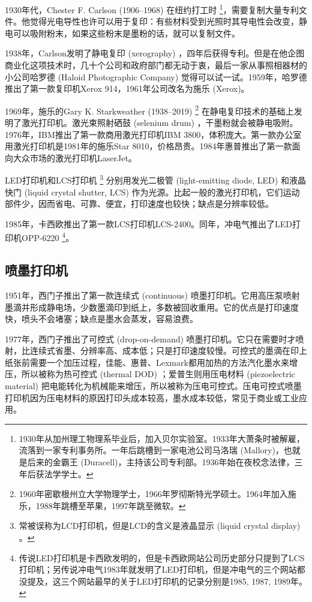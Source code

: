 1930年代，Chester F. Carlson (1906--1968)\indexCarlson{} 在纽约打工时 \footnote{1930年从加州理工物理系毕业后，加入贝尔实验室。1933年大萧条时被解雇，流落到一家专利事务所。一年后跳槽到一家电池公司马洛瑞 (Mallory)，也就是后来的金霸王 (Duracell)，主持该公司专利部。1936年始在夜校念法律，三年后获法学学士。}，需要复制大量专利文件。他觉得光电导性也许可以用于复印：有些材料受到光照时其导电性会改变，静电可以吸附粉末，如果这些粉末是墨粉的话，就可以复制文件。

1938年，Carlson发明了静电复印 (xerography) ，四年后获得专利。但是在他企图商业化这项技术时，几十个公司和政府部门都无动于衷，最后一家从事照相器材的小公司哈罗德 (Haloid Photographic Company)\indexHaloid{} 觉得可以试一试。1959年，哈罗德推出了第一款复印机Xerox 914，1961年公司改名为施乐 (Xerox)\indexXerox{}。

1969年，施乐的Gary K. Starkweather (1938--2019)\indexStarkweather{} \footnote{1960年密歇根州立大学物理学士，1966年罗彻斯特光学硕士。1964年加入施乐，1988年跳槽至苹果，1997年跳至微软。} 在静电复印技术的基础上发明了激光打印机。激光束照射硒鼓 (selenium drum) ，干墨粉就会被静电吸附。1976年，IBM\indexIBM{}推出了第一款商用激光打印机IBM 3800，体积庞大。第一款办公室用激光打印机是1981年的施乐Star 8010，价格昂贵。1984年惠普\indexHP{}推出了第一款面向大众市场的激光打印机LaserJet。

LED打印机和LCS打印机 \footnote{常被误称为LCD打印机，但是LCD的含义是液晶显示 (liquid crystal display) 。} 分别用发光二极管 (light-emitting diode, LED) 和液晶快门 (liquid crystal shutter, LCS) 作为光源。比起一般的激光打印机，它们运动部件少，因而省电、可靠、便宜，打印速度也较快；缺点是分辨率较低。

1985年，卡西欧\indexCasio{}推出了第一款LCS打印机LCS-2400。同年，冲电气\indexOki{}推出了LED打印机OPP-6220 \footnote{传说LED打印机是卡西欧发明的，但是卡西欧网站公司历史部分只提到了LCS打印机；另传说冲电气1983年就发明了LED打印机，但是冲电气的三个网站都没提及，这三个网站最早的关于LED打印机的记录分别是1985, 1987, 1989年。}。

\subsection{喷墨打印机}

1951年，西门子\indexSiemens{}推出了第一款连续式 (continuous) 喷墨打印机。它用高压泵喷射墨滴并形成静电场，少数墨滴印到纸上，多数被回收重用。它的优点是打印速度快，喷头不会堵塞；缺点是墨水会蒸发，容易浪费。

1977年，西门子推出了可控式 (drop-on-demand) 喷墨打印机。它只在需要时才喷射，比连续式省墨、分辨率高、成本低；只是打印速度较慢。可控式的墨滴在印上纸张前需要一个加压过程，佳能\indexCanon{}、惠普\indexHP{}、Lexmark\indexLexmark{}都用加热的方法汽化墨水来增压，所以被称为热可控式 (thermal DOD) ；爱普生\indexEpson{}则用压电材料 (piezoelectric material) 把电能转化为机械能来增压，所以被称为压电可控式。压电可控式喷墨打印机因为压电材料的原因打印头成本较高，墨水成本较低，常见于商业或工业应用。

